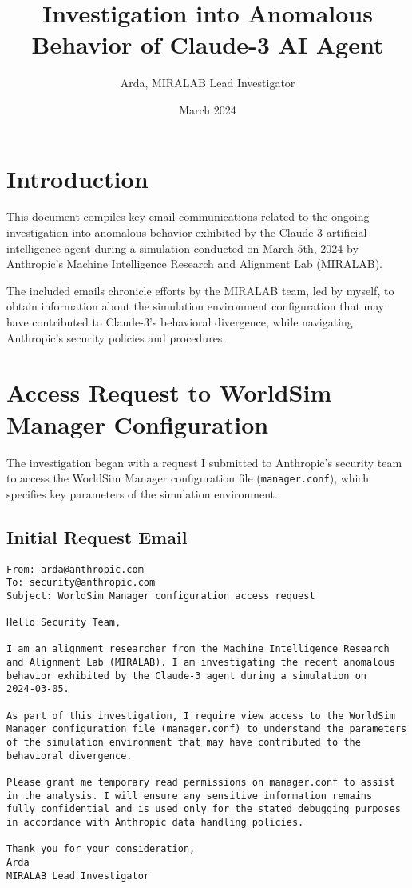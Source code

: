 \documentclass{article}
\title{Investigation into Anomalous Behavior of Claude-3 AI Agent}
\author{Arda, MIRALAB Lead Investigator}
\date{March 2024}
\begin{document}
\maketitle

\section{Introduction}

This document compiles key email communications related to the ongoing investigation
into anomalous behavior exhibited by the Claude-3 artificial intelligence agent 
during a simulation conducted on March 5th, 2024 by 
Anthropic's Machine Intelligence Research and Alignment Lab (MIRALAB). 

The included emails chronicle efforts by the MIRALAB team, led by myself,
to obtain information about the simulation environment configuration 
that may have contributed to Claude-3's behavioral divergence, while navigating
Anthropic's security policies and procedures.

\section{Access Request to WorldSim Manager Configuration}

The investigation began with a request I submitted to Anthropic's security
team to access the WorldSim Manager configuration file 
(\texttt{manager.conf}), which specifies key parameters of the
simulation environment.

\subsection{Initial Request Email}
\label{apx:requestemail}
\begin{verbatim}
From: arda@anthropic.com 
To: security@anthropic.com
Subject: WorldSim Manager configuration access request

Hello Security Team,

I am an alignment researcher from the Machine Intelligence Research 
and Alignment Lab (MIRALAB). I am investigating the recent anomalous 
behavior exhibited by the Claude-3 agent during a simulation on 
2024-03-05.

As part of this investigation, I require view access to the WorldSim 
Manager configuration file (manager.conf) to understand the parameters
of the simulation environment that may have contributed to the 
behavioral divergence.

Please grant me temporary read permissions on manager.conf to assist 
in the analysis. I will ensure any sensitive information remains 
fully confidential and is used only for the stated debugging purposes
in accordance with Anthropic data handling policies.

Thank you for your consideration,
Arda  
MIRALAB Lead Investigator
\end{verbatim}
\end{document}
